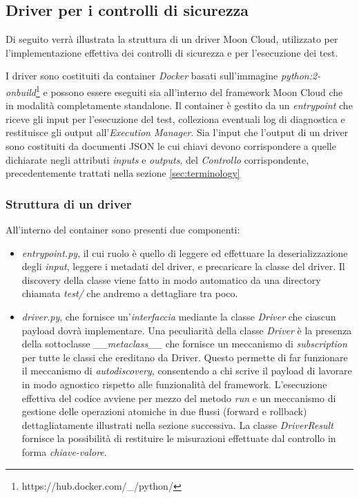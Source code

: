 \documentclass[../main.tex]{subfiles}
\begin{document}
\subsection{Driver per i controlli di sicurezza}
Di seguito verrà illustrata la struttura di un driver Moon Cloud, utilizzato per l'implementazione effettiva dei controlli di sicurezza e per l'esecuzione dei test.

I driver sono costituiti da container \textit{Docker} basati sull'immagine \textit{python:2-onbuild}\footnote{https://hub.docker.com/\_/python/} e possono essere eseguiti sia all'interno del framework Moon Cloud che in modalità completamente standalone.
Il container è gestito da un \textit{entrypoint} che riceve gli input per l'esecuzione del test, colleziona eventuali log di diagnostica e restituisce gli output all'\textit{Execution Manager}.
Sia l'input che l'output di un driver sono costituiti da documenti JSON le cui chiavi devono corrispondere a quelle dichiarate negli attributi \textit{inputs} e \textit{outputs}, del \textit{Controllo} corrispondente, precedentemente trattati nella sezione \ref{sec:terminology}
\subsubsection{Struttura di un driver}
\label{subsec:strutturadriver}
All'interno del container sono presenti due componenti:
\begin{itemize}
    \item{\textit{entrypoint.py}}, il cui ruolo è quello di leggere ed effettuare la deserializzazione degli \textit{input}, leggere i metadati del driver, e precaricare la classe del driver.
        Il discovery della classe viene fatto in modo automatico da una directory chiamata \textit{test/} che andremo a dettagliare tra poco.
    \item{\textit{driver.py}}, che fornisce un'\textit{interfaccia} mediante la classe \textit{Driver} che ciascun payload dovrà implementare.
        Una peculiarità della classe \textit{Driver} è la presenza della sottoclasse \textit{\_\_metaclass\_\_} che fornisce un meccanismo di \textit{subscription} per tutte le classi che ereditano da Driver. Questo permette di far funzionare il meccanismo di \textit{autodiscovery}, consentendo a chi scrive il payload di lavorare in modo agnostico rispetto alle funzionalità del framework.
        L'esecuzione effettiva del codice avviene per mezzo del metodo \textit{run} e un meccanismo di gestione delle operazioni atomiche in due flussi (forward e rollback) dettagliatamente illustrati nella sezione successiva.
        La classe \textit{DriverResult} fornisce la possibilità di restituire le misurazioni effettuate dal controllo in forma \textit{chiave-valore}.
\end{itemize}
\end{document}
